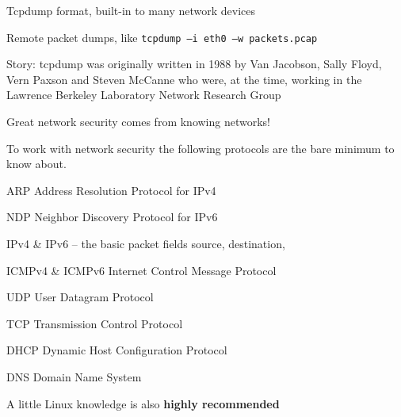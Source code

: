\documentclass[Screen16to9,17pt]{foils}
\begin{document}
\begin{list2}
\item Tcpdump format, built-in to many network devices
\item Remote packet dumps, like \verb+tcpdump –i eth0 –w packets.pcap+
\item Story: tcpdump was originally written in 1988 by Van Jacobson, Sally Floyd, Vern Paxson and Steven McCanne who were, at the time, working in the Lawrence Berkeley Laboratory Network Research Group\\
\end{list2}

\vskip 5mm

\centerline{\Large Great network security comes from knowing networks!}




To work with network security the following protocols are the bare minimum to know about.

\begin{list2}
\item ARP Address Resolution Protocol for IPv4
\item NDP Neighbor Discovery Protocol for IPv6
\item IPv4 \& IPv6 -- the basic packet fields source, destination,
\item ICMPv4 \& ICMPv6 Internet Control Message Protocol
\item UDP User Datagram Protocol
\item TCP Transmission Control Protocol
\item DHCP Dynamic Host Configuration Protocol
\item DNS Domain Name System
\end{list2}

\centerline{A little Linux knowledge is also {\bf highly recommended}}


\end{document}
